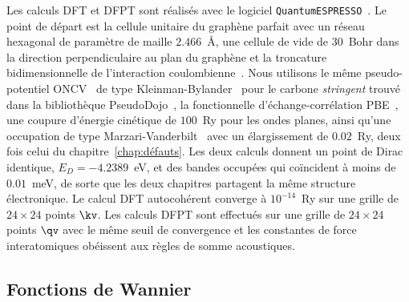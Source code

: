 Les calculs DFT et DFPT sont réalisés avec le logiciel \texttt{QuantumESPRESSO}~\cite{giannozziQUANTUMESPRESSOModular2009,giannozziAdvancedCapabilitiesMaterials2017,giannozziQuantumESPRESSOExascale2020}. Le point de départ est la cellule unitaire du graphène parfait avec un réseau hexagonal de paramètre de maille $2.466$~\AA, une cellule de vide de $30$~Bohr dans la direction perpendiculaire au plan du graphène et la troncature bidimensionnelle de l'interaction coulombienne~\cite{sohierDensityFunctionalPerturbation2017}. Nous utilisons le même pseudo-potentiel ONCV~\cite{hamannOptimizedNormconservingVanderbilt2013} de type Kleinman-Bylander~\cite{kleinmanEfficaciousFormModel1982} pour le carbone \textit{stringent} trouvé dans la bibliothèque PseudoDojo~\cite{vansettenPseudoDojoTrainingGrading2018}, la fonctionnelle d'échange-corrélation PBE~\cite{perdewGeneralizedGradientApproximation1996a}, une coupure d'énergie cinétique de $100$~Ry pour les ondes planes, ainsi qu'une occupation de type Marzari-Vanderbilt~\cite{marzariThermalContractionDisordering1999} avec un élargissement de $0.02$~Ry, deux fois celui du chapitre~\ref{chap:défauts}. Les deux calculs donnent un point de Dirac identique, $E_D=-4.2389$~eV, et des bandes occupées qui coïncident à moins de $0.01$~meV, de sorte que les deux chapitres partagent la même structure électronique. Le calcul DFT autocohérent converge à $10^{-14}$~Ry sur une grille de $24\times 24$ points $\kv$. Les calculs DFPT sont effectués sur une grille de $24\times 24$ points $\qv$ avec le même seuil de convergence et les constantes de force interatomiques obéissent aux règles de somme acoustiques.

\subsection{Fonctions de Wannier}


